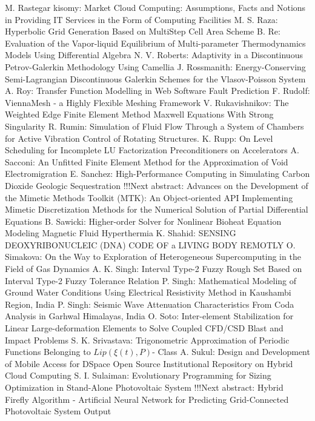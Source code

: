 \documentclass[10pt, A4]{article}%
\begin{document}
{M. Rastegar kisomy}: {Market Cloud Computing: Assumptions, Facts and Notions in Providing IT Services in the Form of Computing Facilities}
{M. S. Raza}: {Hyperbolic Grid Generation Based on MultiStep Cell Area Scheme}
{B. Re}: {Evaluation of the Vapor-liquid Equilibrium of Multi-parameter Thermodynamics Models Using Differential Algebra}
{N. V. Roberts}: {Adaptivity in a Discontinuous Petrov-Galerkin Methodology Using Camellia}
{J. Rossmanith}: {Energy-Conserving Semi-Lagrangian Discontinuous Galerkin Schemes for the Vlasov-Poisson System}
{A. Roy}: {Transfer Function Modelling in Web Software Fault Prediction}
{F. Rudolf}: {ViennaMesh - a Highly Flexible Meshing Framework}
{V. Rukavishnikov}: {The Weighted Edge Finite Element Method Maxwell Equations With Strong Singularity}
{R. Rumin}: {Simulation of Fluid Flow Through a System of Chambers for Active Vibration Control of Rotating Structures.}
{K. Rupp}: {On Level Scheduling for Incomplete LU Factorization Preconditioners on Accelerators}
{A. Sacconi}: {An Unfitted Finite Element Method for the Approximation of Void Electromigration}
{E. Sanchez}: {High-Performance Computing in Simulating Carbon Dioxide Geologic Sequestration       !!!Next abstract: Advances on the Development of the Mimetic Methods Toolkit (MTK): An Object-oriented API Implementing Mimetic Discretization Methods for the Numerical Solution of Partial Differential Equations}
{B. Sawicki}: {Higher-order Solver for Nonlinear Bioheat Equation Modeling Magnetic Fluid Hyperthermia}
{K. Shahid}: {SENSING DEOXYRIBONUCLEIC (DNA) CODE OF a LIVING BODY REMOTLY}
{O. Simakova}: {On the Way to Exploration of Heterogeneous Supercomputing in the Field of Gas Dynamics}
{A. K. Singh}: {Interval Type-2 Fuzzy Rough Set Based on Interval Type-2 Fuzzy Tolerance Relation}
{P. Singh}: {Mathematical Modeling of Ground Water Conditions Using Electrical Resistivity Method in Kaushambi Region, India}
{P. Singh}: {Seismic Wave Attenuation Characteristics  From Coda Analysis in Garhwal Himalayas, India}
{O. Soto}: {Inter-element Stabilization for Linear Large-deformation Elements to Solve Coupled CFD/CSD Blast and Impact Problems}
{S. K. Srivastava}: {Trigonometric Approximation of Periodic Functions Belonging to $Lip(\xi(t), P)$- Class}
{A. Sukul}: {Design and Development of Mobile Access for DSpace Open Source Institutional Repository on Hybrid Cloud Computing}
{S. I. Sulaiman}: {Evolutionary Programming for Sizing Optimization in Stand-Alone Photovoltaic System       !!!Next abstract: Hybrid Firefly Algorithm - Artificial Neural Network for Predicting Grid-Connected Photovoltaic System Output}
\end{document}
